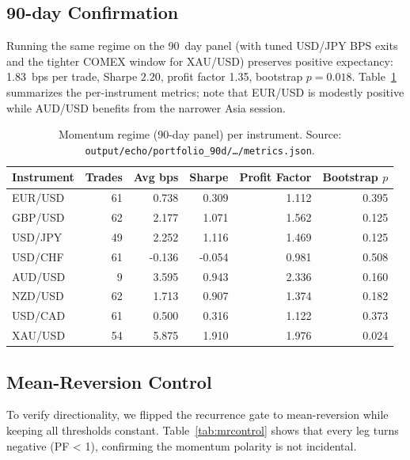 \documentclass[11pt]{article}
\begin{document}
\subsection{90-day Confirmation}
Running the same regime on the \SI{90}{day} panel (with tuned USD/JPY BPS exits and the tighter COMEX window for XAU/USD) preserves positive expectancy: \SI{1.83}{bps} per trade, Sharpe \(2.20\), profit factor 1.35, bootstrap \(p=0.018\). Table~\ref{tab:momentum90} summarizes the per-instrument metrics; note that EUR/USD is modestly positive while AUD/USD benefits from the narrower Asia session.

\begin{table}[h]
  \centering
  \caption{Momentum regime (90-day panel) per instrument. Source: \texttt{output/echo/portfolio\_90d/\dots/metrics.json}.}
  \label{tab:momentum90}\small
  \begin{tabular}{lrrrrr}
    \toprule
    Instrument & Trades & Avg bps & Sharpe & Profit Factor & Bootstrap $p$ \\
    \midrule
    EUR/USD & 61 & 0.738 & 0.309 & 1.112 & 0.395 \\
    GBP/USD & 62 & 2.177 & 1.071 & 1.562 & 0.125 \\
    USD/JPY & 49 & 2.252 & 1.116 & 1.469 & 0.125 \\
    USD/CHF & 61 & -0.136 & -0.054 & 0.981 & 0.508 \\
    AUD/USD & 9 & 3.595 & 0.943 & 2.336 & 0.160 \\
    NZD/USD & 62 & 1.713 & 0.907 & 1.374 & 0.182 \\
    USD/CAD & 61 & 0.500 & 0.316 & 1.122 & 0.373 \\
    XAU/USD & 54 & 5.875 & 1.910 & 1.976 & 0.024 \\
    \bottomrule
  \end{tabular}
\end{table}

\subsection{Mean-Reversion Control}
To verify directionality, we flipped the recurrence gate to mean-reversion while keeping all thresholds constant. Table~\ref{tab:mrcontrol} shows that every leg turns negative (PF < 1), confirming the momentum polarity is not incidental.
\end{document}

